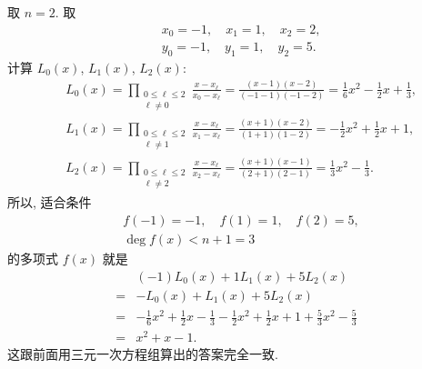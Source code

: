 \begin{example}
    取 $n = 2$. 取
    \begin{align*}
         & x_0 = -1, \quad x_1 = 1, \quad x_2 = 2, \\
         & y_0 = -1, \quad y_1 = 1, \quad y_2 = 5.
    \end{align*}
    计算 $L_0 (x)$, $L_1 (x)$, $L_2 (x)$:
    \begin{align*}
         & L_0 (x) = \prod_{\begin{smallmatrix}0 \leq \ell \leq 2 \\\ell \neq 0\end{smallmatrix}} \frac{x - x_\ell}{x_0 - x_\ell} = \frac{(x - 1)(x - 2)}{(-1 - 1)(-1 - 2)} = \frac16 x^2 - \frac12 x + \frac13, \\
         & L_1 (x) = \prod_{\begin{smallmatrix}0 \leq \ell \leq 2 \\\ell \neq 1\end{smallmatrix}} \frac{x - x_\ell}{x_1 - x_\ell} = \frac{(x + 1)(x - 2)}{(1 + 1)(1 - 2)} = -\frac12 x^2 + \frac12 x + 1,        \\
         & L_2 (x) = \prod_{\begin{smallmatrix}0 \leq \ell \leq 2 \\\ell \neq 2\end{smallmatrix}} \frac{x - x_\ell}{x_2 - x_\ell} = \frac{(x + 1)(x - 1)}{(2 + 1)(2 - 1)} = \frac13 x^2 - \frac13.
    \end{align*}
    所以, 适合条件
    \begin{align*}
         & f(-1) = -1, \quad f(1) = 1, \quad f(2) = 5, \\
         & \deg f(x) < n + 1 = 3
    \end{align*}
    的多项式 $f(x)$ 就是
    \begin{align*}
             & (-1)L_0 (x) + 1L_1 (x) + 5L_2 (x)  \\
        = {} & -L_0 (x) + L_1 (x) + 5L_2 (x)      \\
        = {} & -\frac16 x^2 + \frac12 x - \frac13
        - \frac12 x^2 + \frac12 x + 1
        + \frac53 x^2 - \frac53                   \\
        = {} & x^2 + x - 1.
    \end{align*}
    这跟前面用三元一次方程组算出的答案完全一致.
\end{example}

